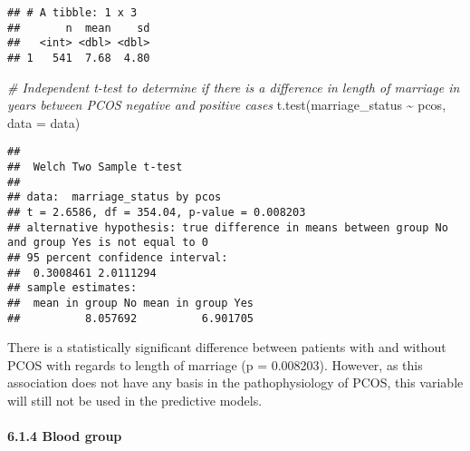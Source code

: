 \documentclass[
]{article}
\newenvironment{Shaded}{\begin{snugshade}}{\end{snugshade}}
\newcommand{\AttributeTok}[1]{\textcolor[rgb]{0.77,0.63,0.00}{#1}}
\newcommand{\CommentTok}[1]{\textcolor[rgb]{0.56,0.35,0.01}{\textit{#1}}}
\newcommand{\ConstantTok}[1]{\textcolor[rgb]{0.00,0.00,0.00}{#1}}
\newcommand{\FloatTok}[1]{\textcolor[rgb]{0.00,0.00,0.81}{#1}}
\newcommand{\FunctionTok}[1]{\textcolor[rgb]{0.00,0.00,0.00}{#1}}
\newcommand{\NormalTok}[1]{#1}
\newcommand{\OtherTok}[1]{\textcolor[rgb]{0.56,0.35,0.01}{#1}}
\newcommand{\SpecialCharTok}[1]{\textcolor[rgb]{0.00,0.00,0.00}{#1}}
\newcommand{\StringTok}[1]{\textcolor[rgb]{0.31,0.60,0.02}{#1}}
\begin{document}
\begin{verbatim}
## # A tibble: 1 x 3
##       n  mean    sd
##   <int> <dbl> <dbl>
## 1   541  7.68  4.80
\end{verbatim}

\begin{Shaded}
\begin{Highlighting}[]
\CommentTok{\# Independent t{-}test to determine if there is a difference in length of marriage in years between PCOS negative and positive cases}
\FunctionTok{t.test}\NormalTok{(marriage\_status }\SpecialCharTok{\textasciitilde{}}\NormalTok{ pcos, }\AttributeTok{data =}\NormalTok{ data)}
\end{Highlighting}
\end{Shaded}

\begin{verbatim}
## 
##  Welch Two Sample t-test
## 
## data:  marriage_status by pcos
## t = 2.6586, df = 354.04, p-value = 0.008203
## alternative hypothesis: true difference in means between group No and group Yes is not equal to 0
## 95 percent confidence interval:
##  0.3008461 2.0111294
## sample estimates:
##  mean in group No mean in group Yes 
##          8.057692          6.901705
\end{verbatim}

There is a statistically significant difference between patients with
and without PCOS with regards to length of marriage (p = 0.008203).
However, as this association does not have any basis in the
pathophysiology of PCOS, this variable will still not be used in the
predictive models.

\hypertarget{blood-group}{%
\paragraph{6.1.4 Blood group}\label{blood-group}}

\begin{Shaded}
\end{Shaded}
\end{document}
